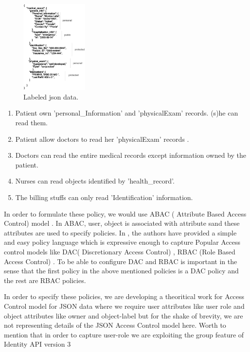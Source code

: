 \begin{figure}[h!]
  \centering
    \includegraphics[width=0.3\textwidth]{eps/json-data}
 \caption{Labeled json data.}
\label {fig:patient Record} 
\end{figure}



\begin{enumerate}

  \item   Patient own 'personal\_Information' and 'physicalExam' records. (s)he can read them.  

\item  Patient allow doctors to read her 'physicalExam' records  .
\item  Doctors can read  the entire medical records except information owned by the patient.  
\item  Nurses can read objects identified by  'health\_record'.  
\item  The billing stuffs can only read 'Identification' information.  
\end{enumerate}

In order to  formulate these policy, we would use ABAC ( Attribute Based Access Control) model \cite{abac}. In ABAC, user, object is associated with attribute sand these attributes are used to specify policies. In \cite{abac}, the authors have provided a simple and easy policy language which is expressive enough to capture Popular Access control models like  DAC( Discretionary Access Control) \cite{dac}, RBAC (Role Based Access Control) \cite{rbac}. To be able to configure DAC and RBAC is important in the sense that the first policy in the above mentioned policies is a DAC policy and the rest are RBAC policies.

In order to specify these policies, we are developing a theoritical work for Access Control model for JSON data where we require user attributes like user role and object attributes like owner and object-label but for the shake of brevity, we are not representing details of the JSON Access Control model  here. Worth to mention that in order to capture user-role we are exploiting the group feature of Identity API version 3 \cite{identityv3}

